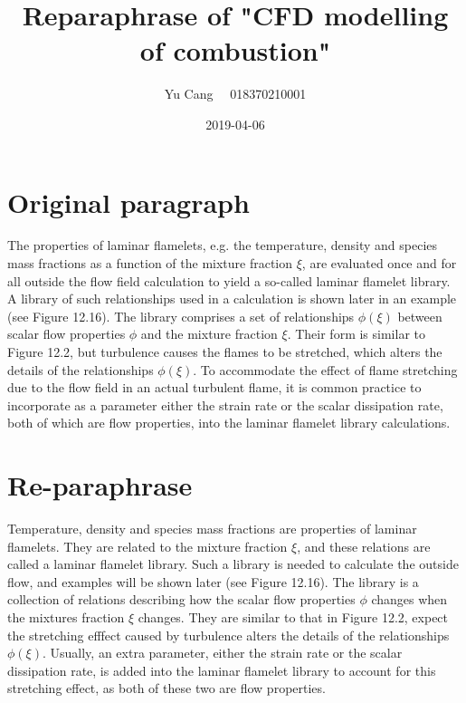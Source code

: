 \documentclass[paper=a4, fontsize=11pt]{scrartcl}
\title{Reparaphrase of "CFD modelling of combustion"}
\author{Yu Cang \ \ 018370210001}
\date{2019-04-06}
\begin{document}
\maketitle

\section{Original paragraph}
	The properties of laminar flamelets, e.g. the temperature, density and
species mass fractions as a function of the mixture fraction $\xi$, are evaluated
once and for all outside the flow field calculation to yield a so-called laminar
flamelet library. A library of such relationships used in a calculation is
shown later in an example (see Figure 12.16). The library comprises a set of
relationships $\phi(\xi)$ between scalar flow properties $\phi$ and the mixture fraction
$\xi$. Their form is similar to Figure 12.2, but turbulence causes the flames to
be stretched, which alters the details of the relationships $\phi(\xi)$. To accommodate
the effect of flame stretching due to the flow field in an actual turbulent
flame, it is common practice to incorporate as a parameter either the strain
rate or the scalar dissipation rate, both of which are flow properties, into
the laminar flamelet library calculations.

\section{Re-paraphrase}
	Temperature, density and species mass fractions are properties of laminar flamelets. They are related to the mixture fraction $\xi$, and these relations are called a laminar flamelet library. Such a library is needed to calculate the outside flow, and examples will be shown later (see Figure 12.16). The library is a collection of relations describing how the scalar flow properties $\phi$ changes when the mixtures fraction $\xi$ changes. They are similar to that in Figure 12.2, expect the stretching efffect caused by turbulence alters the details of the relationships $\phi(\xi)$. Usually, an extra parameter, either the strain rate or the scalar dissipation rate, is added into the laminar flamelet library to account for this stretching effect, as both of these two are flow properties.
	
\end{document}
